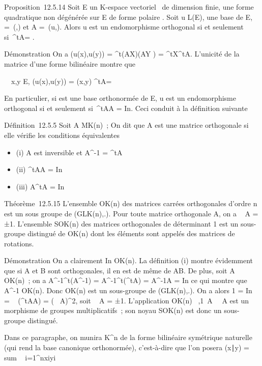 Proposition~12.5.14 Soit E un K-espace vectoriel ~de dimension finie, \Phi
une forme quadratique non dégénérée sur E de forme polaire \phi. Soit u \in
L(E),  une base de E, \Omega =\
\mathrmMat (\phi,) et A =\
\mathrmMat (u,). Alors u est un endomorphisme
orthogonal si et seulement si~^tA\OmegaA = \Omega.

Démonstration On a \phi(u(x),u(y)) = ^t(AX)\Omega(AY ) =
^tX^tA\OmegaAY . L'unicité de la matrice d'une forme
bilinéaire montre que

\forall~~x,y \in E, \phi(u(x),u(y)) = \phi(x,y)
\Leftrightarrow ^tA\OmegaA = \Omega

En particulier, si  est une base orthonormée de E, u est un
endomorphisme orthogonal si et seulement si~^tAA =
In. Ceci conduit à la définition suivante

Définition~12.5.5 Soit A \in MK(n)~; On dit que A est une
matrice orthogonale si elle vérifie les conditions équivalentes

\begin{itemize}
\itemsep1pt\parskip0pt
\item
  (i) A est inversible et A^-1 = ^tA
\item
  (ii) ^tAA = In
\item
  (iii) A^tA = In
\end{itemize}

Théorème~12.5.15 L'ensemble OK(n) des matrices carrées
orthogonales d'ordre n est un sous groupe de (GLK(n),.). Pour
toute matrice orthogonale A, on a
\mathrm{det}~ A = ±1.
L'ensemble SOK(n) des matrices orthogonales de déterminant 1
est un sous-groupe distingué de OK(n) dont les éléments sont
appelés des matrices de rotations.

Démonstration On a clairement In \in OK(n). La
définition (i) montre évidemment que si A et B sont orthogonales, il en
est de même de AB. De plus, soit A \in OK(n)~; on a
A^-1^t(A^-1) =
A^-1^t(^tA) = A^-1A =
In ce qui montre que A^-1 \in OK(n). Donc
OK(n) est un sous-groupe de (GLK(n),.). On a alors 1
=  In~
= ~
(^tAA) =
(~
A)^2, soit
~ A = ±1.
L'application OK(n) \rightarrow~,1\,
A\mapsto~\mathrm{det}~
A est un morphisme de groupes multiplicatifs~; son noyau
SOK(n) est donc un sous-groupe distingué.

Dans ce paragraphe, on munira K^n de la forme bilinéaire
symétrique naturelle (qui rend la base canonique orthonormée),
c'est-à-dire que l'on posera (x∣y)
= \\sum ~
i=1^nxiyi


